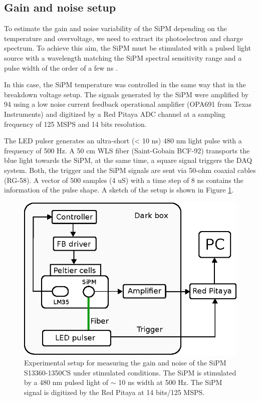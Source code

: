 \documentclass[a4paper,11pt]{article}
\begin{document}
\subsection{Gain and noise setup}

To estimate the gain and noise variability of the SiPM depending on the temperature and overvoltage, we need to extract its photoelectron and charge spectrum. To achieve this aim, the SiPM must be stimulated with a pulsed light source with a wavelength matching the SiPM spectral sensitivity range and a pulse width of the order of a few ns \cite{Georgiev2016, Eigen2019}.

In this case, the SiPM temperature was controlled in the same way that in the breakdown voltage setup. The signals generated by the SiPM were amplified by 94 using a low noise current feedback operational amplifier (OPA691 from Texas Instruments) and digitized by a Red Pitaya ADC channel at a sampling frequency of 125 MSPS and 14 bits resolution.

The LED pulser generates an ultra-short (< 10 ns) 480 nm light pulse with a frequency of 500 Hz. A 50 cm WLS fiber (Saint-Gobain BCF-92) transports the blue light towards the SiPM, at the same time, a square signal triggers the DAQ system. Both, the trigger and the SiPM signals are sent via 50-ohm coaxial cables (RG-58). A vector of 500 samples (4 uS) with a time step of 8 ns contains the information of the pulse shape. A sketch of the setup is shown in Figure \ref{fig:set2}.


\begin{figure}[htbp]
\centering %
\includegraphics[width=.6\textwidth]{Figures/ExpSet2.eps}
\caption{\label{fig:set2} Experimental setup for measuring the gain and noise of the SiPM S13360-1350CS under stimulated conditions. The SiPM is stimulated by a 480 nm pulsed light of $\sim$ 10 ns width at 500 Hz. The SiPM signal is digitized by the Red Pitaya at 14 bits/125 MSPS.}
\end{figure}
\end{document}
